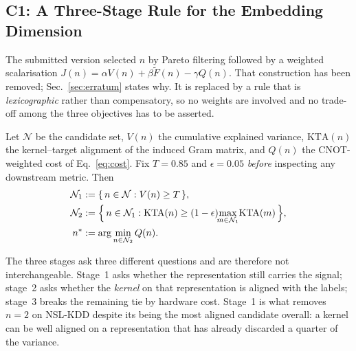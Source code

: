 \subsection{C1: A Three-Stage Rule for the Embedding Dimension}

\begin{revbody}


The submitted version selected $n$ by Pareto filtering followed by a weighted
scalarisation $J(n) = \alpha V(n) + \beta\widetilde{F}(n) - \gamma Q(n)$. That
construction has been removed; Sec.~\ref{sec:erratum} states why. It is replaced
by a rule that is \emph{lexicographic} rather than compensatory, so no weights
are involved and no trade-off among the three objectives has to be asserted.

\begin{definition}
\label{def:three-stage}
Let $\mathcal{N}$ be the candidate set, $V(n)$ the cumulative explained variance,
$\mathrm{KTA}(n)$ the kernel--target alignment of the induced Gram matrix, and
$Q(n)$ the CNOT-weighted cost of Eq.~\eqref{eq:cost}. Fix $T=0.85$ and $\epsilon=0.05$
\emph{before} inspecting any downstream metric. Then
\begin{align}
  \mathcal{N}_1 &:= \{\, n \in \mathcal{N} : V(n) \ge T \,\}, \\
  \mathcal{N}_2 &:= \Bigl\{\, n \in \mathcal{N}_1 : \mathrm{KTA}(n) \ge
                   (1-\epsilon)\!\!\max_{m\in\mathcal{N}_1}\!\mathrm{KTA}(m)
                   \,\Bigr\}, \\
  n^{\ast}      &:= \arg\min_{n \in \mathcal{N}_2} Q(n).
\end{align}
\end{definition}

The three stages ask three different questions and are therefore not
interchangeable. Stage~1 asks whether the representation still carries the
signal; stage~2 asks whether the \emph{kernel} on that representation is aligned
with the labels; stage~3 breaks the remaining tie by hardware cost. Stage~1 is
what removes $n=2$ on NSL-KDD despite its being the most aligned candidate
overall: a kernel can be well aligned on a representation that has already
discarded a quarter of the variance.


\end{revbody}
